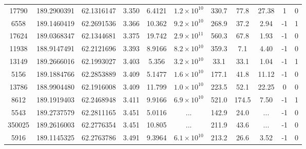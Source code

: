 \begin{table}
\begin{tabular}{ccccccccccc}
      17790 &                  189.2900391 &                 62.1316147 &          3.350 &           6.4121 & $1.2\times10^{10}$ &          330.7 &        77.8 &       27.38 &                1 &                  0 \\
       6558 &                  189.1460419 &                 62.2691536 &          3.366 &           10.362 & $9.2\times10^{10}$ &          268.9 &        37.2 &        2.94 &               -1 &                  1 \\
      17624 &                  189.0368347 &                 62.1344681 &          3.375 &           19.742 & $2.9\times10^{11}$ &          560.3 &        67.8 &        1.93 &               -1 &                  0 \\
      11938 &                  188.9147491 &                 62.2121696 &          3.393 &           8.9166 & $8.2\times10^{10}$ &          359.3 &         7.1 &        4.40 &               -1 &                  0 \\
      13149 &                  189.2666016 &                 62.1993027 &          3.403 &            5.356 & $3.2\times10^{10}$ &           33.1 &        33.1 &        1.04 &               -1 &                  1 \\
       5156 &                  189.1884766 &                 62.2853889 &          3.409 &           5.1477 & $1.6\times10^{10}$ &          177.1 &        41.8 &       11.12 &               -1 &                  0 \\
      13786 &                  188.9904480 &                 62.1916008 &          3.409 &           11.799 & $1.0\times10^{10}$ &          223.5 &        52.1 &       22.25 &                0 &                  0 \\
       8612 &                  189.1919403 &                 62.2468948 &          3.411 &           9.9166 & $6.9\times10^{10}$ &          521.0 &       174.5 &        7.50 &               -1 &                  1 \\
       5543 &                  189.2737579 &                 62.2811165 &          3.451 &           5.0116 &                ... &          142.9 &        24.0 &         ... &               -1 &                  0 \\
     350025 &                  189.2616003 &                 62.2776354 &          3.451 &           10.805 &                ... &          211.9 &        43.6 &         ... &               -1 &                  0 \\
       5916 &                  189.1145325 &                 62.2763786 &          3.491 &           9.3964 & $6.1\times10^{10}$ &          213.2 &        26.6 &        3.52 &               -1 &                  0 \\

\end{tabular}
\end{table}
